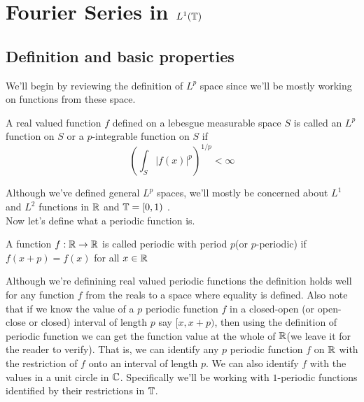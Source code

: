 \newpage
\section{Fourier Series in $L^1(\mathbb T)$}

  \subsection{Definition and basic properties}

    We'll begin by reviewing the definition of $L^p$ space since we'll be mostly working on functions from these space.
  \begin{definition}[$L^p$ function]
    \label{def:Lp_function}
    A real valued function $f$ defined on a lebesgue measurable space $S$ is called an $L^p$ function on $S$ or a $p$-integrable function on $S$ if 
    \begin{displaymath}
       \left( \int_{S} |f(x)|^p \right)^{1/p} < \infty
    \end{displaymath}
\end{definition}  
  Although we've defined general $L^p$ spaces, we'll mostly be concerned about $L^1$ and $L^2$ functions in $\mathbb R$ and $\mathbb T = [0, 1)$ .
  \\

  Now let's define what a periodic function is.
  \begin{definition}
    \label{def:periodic_function}
    A function $f:\mathbb R \to \mathbb R$ is called periodic with period $p$(or $p$-periodic) if $f(x+p) = f(x)$ for all $x \in \mathbb R$

  \end{definition}
  Although we're definining real valued periodic functions the definition holds well for any function $f$ from the reals to a space where equality is defined.
  Also note that if we know the value of a $p$ periodic function $f$ in a closed-open (or open-close or closed) interval of length $p$ say $[x, x+p)$, then using the definition of periodic function we can get the function value at the whole of $\mathbb R$(we leave it for the reader to verify). That is, we can identify any $p$ periodic function $f$ on $\mathbb R$ with the restriction of $f$ onto an interval of length $p$. We can also identify $f$ with the values in a unit circle in $\mathbb C$.
  Specifically we'll be working with $1$-periodic functions identified by their restrictions in $\mathbb T$.
\\

